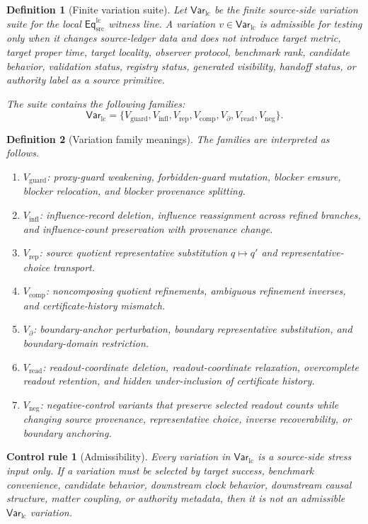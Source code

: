 \documentclass[11pt]{article}
\newcommand{\EqLC}{\mathsf{Eq}_{\mathrm{src}}^{\mathrm{lc}}}
\newcommand{\VarLC}{\mathsf{Var}_{\mathrm{lc}}}
\newtheorem{definition}{Definition}
\newtheorem{controlrule}{Control rule}
\begin{document}
\begin{definition}[Finite variation suite]
Let \(\VarLC\) be the finite source-side variation suite for the local
\(\EqLC\) witness line. A variation \(v\in\VarLC\) is admissible for
testing only when it changes source-ledger data and does not introduce
target metric, target proper time, target locality, observer protocol,
benchmark rank, candidate behavior, validation status, registry status,
generated visibility, handoff status, or authority label as a source
primitive.

The suite contains the following families:
\[
\VarLC=
\{V_{\mathrm{guard}},V_{\mathrm{infl}},V_{\mathrm{rep}},
V_{\mathrm{comp}},V_{\partial},V_{\mathrm{read}},V_{\mathrm{neg}}\}.
\]
\end{definition}

\begin{definition}[Variation family meanings]
The families are interpreted as follows.
\begin{enumerate}
    \item \(V_{\mathrm{guard}}\): proxy-guard weakening, forbidden-guard
    mutation, blocker erasure, blocker relocation, and blocker
    provenance splitting.
    \item \(V_{\mathrm{infl}}\): influence-record deletion, influence
    reassignment across refined branches, and influence-count
    preservation with provenance change.
    \item \(V_{\mathrm{rep}}\): source quotient representative
    substitution \(q\mapsto q'\) and representative-choice transport.
    \item \(V_{\mathrm{comp}}\): noncomposing quotient refinements,
    ambiguous refinement inverses, and certificate-history mismatch.
    \item \(V_{\partial}\): boundary-anchor perturbation, boundary
    representative substitution, and boundary-domain restriction.
    \item \(V_{\mathrm{read}}\): readout-coordinate deletion,
    readout-coordinate relaxation, overcomplete readout retention, and
    hidden under-inclusion of certificate history.
    \item \(V_{\mathrm{neg}}\): negative-control variants that preserve
    selected readout counts while changing source provenance,
    representative choice, inverse recoverability, or boundary
    anchoring.
\end{enumerate}
\end{definition}

\begin{controlrule}[Admissibility]
Every variation in \(\VarLC\) is a source-side stress input only. If a
variation must be selected by target success, benchmark convenience,
candidate behavior, downstream clock behavior, downstream causal
structure, matter coupling, or authority metadata, then it is not an
admissible \(\VarLC\) variation.
\end{controlrule}
\end{document}
